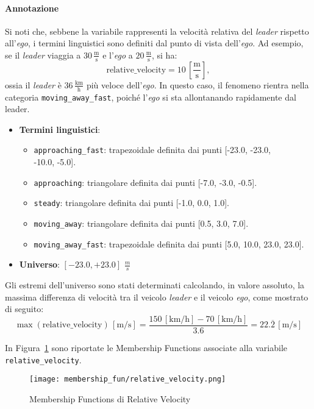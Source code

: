 \paragraph{Annotazione} Si noti che, sebbene la variabile rappresenti la velocità relativa del \emph{leader} rispetto all'\emph{ego}, 
i termini linguistici sono definiti dal punto di vista dell'\emph{ego}. Ad esempio, se il \emph{leader} viaggia a $30\,\frac{\mathrm{m}}{\mathrm{s}}$ e 
l'\emph{ego} a $20\,\frac{\mathrm{m}}{\mathrm{s}}$, si ha:
\[
\text{relative\_velocity} = 10\,[\frac{\mathrm{m}}{\mathrm{s}}],
\]
ossia il \emph{leader} è $36\,\frac{\mathrm{km}}{\mathrm{h}}$ più veloce dell'\emph{ego}. In questo caso, il fenomeno rientra nella categoria 
\texttt{moving\_away\_fast}, poiché l'\emph{ego} si sta allontanando rapidamente dal leader.
\begin{itemize}
  \item \textbf{Termini linguistici}:
    \begin{itemize}
      \item \texttt{approaching\_fast}: trapezoidale definita dai punti [-23.0, -23.0, \\ -10.0, -5.0].
      \item \texttt{approaching}: triangolare definita dai punti [-7.0, -3.0, -0.5].
      \item \texttt{steady}: triangolare definita dai punti [-1.0, 0.0, 1.0].
      \item \texttt{moving\_away}: triangolare definita dai punti [0.5, 3.0, 7.0].
      \item \texttt{moving\_away\_fast}: trapezoidale definita dai punti [5.0, 10.0, 23.0, 23.0].
    \end{itemize}
  \item \textbf{Universo}: \([-23.0,+23.0]\) $\frac{m}{s}$
\end{itemize}
Gli estremi dell'universo sono stati determinati calcolando, in valore assoluto, la massima differenza di velocità tra il veicolo
\emph{leader} e il veicolo \emph{ego}, come mostrato di seguito:
\[
  \max(\text{relative\_velocity}) \,[\mathrm{m}/\mathrm{s}]
  = \frac{150\,[\mathrm{km}/\mathrm{h}] - 70\,[\mathrm{km}/\mathrm{h}]}{3.6}
  = 22.\overline{2}\,[\mathrm{m}/\mathrm{s}]
\]

\noindent In Figura~\ref{Fig:mf_relative_velocity} sono riportate le Membership Functions associate alla variabile \texttt{relative\_velocity}.
\begin{figure}[H]
    \centering
    \texttt{[image: membership\_fun/relative\_velocity.png]}
    \caption{Membership Functions di Relative Velocity}
    \label{Fig:mf_relative_velocity}
\end{figure}


